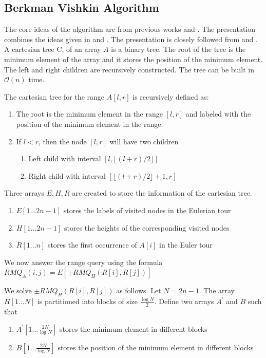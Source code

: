 \documentclass{article}
\begin{document}
\subsection{Berkman Vishkin Algorithm}
The core ideas of the algorithm are from previous works \cite{gabowtarjan} and \cite{gabowbentley}. The presentation combines the ideas given in \cite{berkmanvishkin} and \cite{gabowbentley}. The presentation is closely followed from \cite{bendercolton} and \cite{fischerheun}. A cartesian tree C, of an array $A$ is a binary tree. The root of the tree is the minimum element of the array and it stores the position of the minimum element. The left and right children are recursively constructed. The tree can be built in $\mathcal{O}(n)$ time.

The cartesian tree for the range $A[l, r]$ is recursively defined as:
\begin{enumerate}
\item The root is the minimum element in the range $[l, r]$ and labeled with the position of the minimum element in the range.
\item If $l < r$, then the node $[l, r]$ will have two children
\begin{enumerate}
\item Left child with interval $[l, \lfloor (l+r)/2 \rfloor]$
\item Right child with interval $[\lfloor (l+r)/2 \rfloor + 1, r]$
\end{enumerate}
\end{enumerate}

Three arrays $E, H, R$ are created to store the information of the cartesian tree.
\begin{enumerate}
\item $E[1 \ldots 2n-1]$ stores the labels of visited nodes in the Eulerian tour
\item $H[1 \ldots 2n-1]$ stores the heights of the corresponding visited nodes
\item $R[1 \ldots n]$ stores the first occurrence of $A[i]$ in the Euler tour
\end{enumerate}

We now answer the range query using the formula\\
$RMQ_A(i, j) = E[\pm RMQ_H(R[i], R[j])]$

We solve $\pm RMQ_H(R[i], R[j])$ as follows. Let $N = 2n-1$. The array $H[1 \ldots N]$ is partitioned into blocks of size $\frac{\log N}{2}$. Define two arrays $A^\prime$ and $B$ such that
\begin{enumerate}
\item $A^\prime[1 \ldots \frac{2N}{\log N}]$ stores the minimum element in different blocks
\item $B[1 \ldots \frac{2N}{\log N}]$ stores the position of the minimum element in different blocks
\end{enumerate} 
\end{document}
